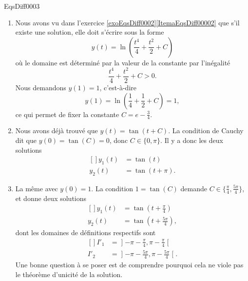
\begin{corrige}{EqsDiff0003}

\begin{enumerate}

\item
Nous avons vu dans l'exercice \ref{exoEqsDiff0002}\ref{ItemaEqsDiff00002} que s'il existe une solution, elle doit s'écrire sous la forme
\begin{equation}
	y(t)=\ln\left( \frac{ t^4 }{ 4 }+\frac{ t^2 }{ 2 }+C \right)
\end{equation}
où le domaine est déterminé par la valeur de la constante par l'inégalité
\begin{equation}
	 \frac{ t^4 }{ 4 }+\frac{ t^2 }{ 2 }+C >0.
\end{equation}
Nous demandons $y(1)=1$, c'est-à-dire
\begin{equation}
	y(1)= \ln\left(\frac{ 1 }{ 4 }+\frac{ 1 }{ 2 }+C\right) =1,
\end{equation}
ce qui permet de fixer la constante $C=e-\frac{ 3 }{ 4 }$.

\item
Nous avons déjà trouvé que $y(t)=\tan(t+C)$. La condition de Cauchy dit que $y(0)=\tan(C)=0$, donc $C\in\{ 0,\pi \}$. Il y a donc les deux solutions
\begin{equation}
	\begin{aligned}[]
		y_1(t)&=\tan(t)\\
		y_2(t)&=\tan(t+\pi).
	\end{aligned}
\end{equation}

\item
La même avec $y(0)=1$. La condition $1=\tan(C)$ demande $C\in\{ \frac{ \pi }{ 4 },\frac{ 5\pi }{ 4 } \}$, et donne deux solutions
\begin{equation}
	\begin{aligned}[]
		y_1(t)&=\tan(t+\frac{ \pi }{ 4 })\\
		y_2(t)&=\tan(t+\frac{ 5\pi }{ 4 }),
	\end{aligned}
\end{equation}
dont les domaines de définitions respectifs sont
\begin{equation}
	\begin{aligned}[]
		I'_1&=\mathopen]-\pi-\frac{ \pi }{ 4 },\pi-\frac{ \pi }{ 4 }\mathclose[\\
		I'_2&=\mathopen]-\pi-\frac{ 5\pi }{ 4 },\pi-\frac{ 5\pi }{ 4 }\mathclose[.
	\end{aligned}
\end{equation}
Une bonne question à se poser est de comprendre pourquoi cela ne viole pas le théorème d'unicité de la solution.


\end{enumerate}
\end{corrige}
